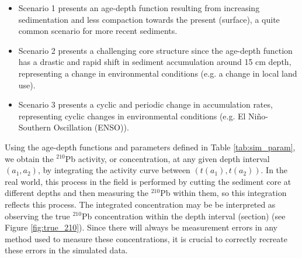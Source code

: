 \documentclass [10pt] {article}
\begin{document}
\begin{itemize}
	\item Scenario 1 presents an age-depth function resulting from increasing sedimentation and less compaction towards the present (surface), a quite common scenario for more recent sediments. 
	
	\item Scenario 2 presents a challenging core structure since the age-depth function has a drastic and rapid shift in sediment accumulation around 15 cm depth, representing a change in environmental conditions (e.g. a change in local land use).
 
	\item Scenario 3 presents a cyclic and periodic change in accumulation rates, representing cyclic changes in environmental conditions (e.g. El Niño-Southern Oscillation (ENSO)). 
\end{itemize} 

Using the age-depth functions and parameters defined in Table \ref{tab:sim_param}, we obtain the $^{210}$Pb activity, or concentration, at any given depth interval $(a_1,a_2)$, by integrating the activity curve between $(t(a_1),t(a_2))$.  
In the real world, this process in the field is performed by cutting the sediment core at different depths and then measuring the $^{210}$Pb within them, so this integration reflects this process.
The integrated concentration may be be interpreted as observing the true $^{210}$Pb concentration within the depth interval (section)
(see Figure \ref{fig:true_210}).
Since there will always be measurement errors in any method used to measure these concentrations, it is crucial to correctly recreate these errors in the simulated data.

 
\end{document}
